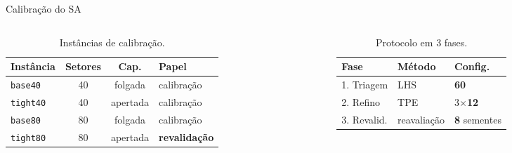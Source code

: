 \documentclass[aspectratio=169,11pt]{beamer}
\begin{document}
\begin{frame}{Calibração do SA}
\vspace{0.3cm}
\begin{columns}[T]
    \begin{column}{0.48\textwidth}
        \begin{table}
            \centering
            \footnotesize
            \caption{Instâncias de calibração.}
            \label{tab:calibracao-instancias}
            \begin{tabular}{lccl}
                \toprule
                Instância & Setores & Cap. & Papel \\
                \midrule
                \texttt{base40}  & 40 & folgada  & calibração \\
                \texttt{tight40} & 40 & apertada & calibração \\
                \texttt{base80}  & 80 & folgada  & calibração \\
                \texttt{tight80} & 80 & apertada & \textbf{revalidação} \\
                \bottomrule
            \end{tabular}
        \end{table}
    \end{column}
    \begin{column}{0.48\textwidth}
        \begin{table}
            \centering
            \footnotesize
            \caption{Protocolo em 3 fases.}
            \label{tab:calibracao-protocolo}
            \begin{tabular}{lll}
                \toprule
                Fase & Método & Config. \\
                \midrule
                1. Triagem      & LHS \cite{mckay1979comparison}                 & \textbf{60} \\
                2. Refino       & TPE \cite{bergstra2011algorithms} \cite{akiba2019optuna}        & 3$\times$\textbf{12} \\
                3. Revalid.  & reavaliação          & \textbf{8} sementes \\
                \bottomrule
            \end{tabular}
        \end{table}
    \end{column}
\end{columns}
\end{frame}
\end{document}
